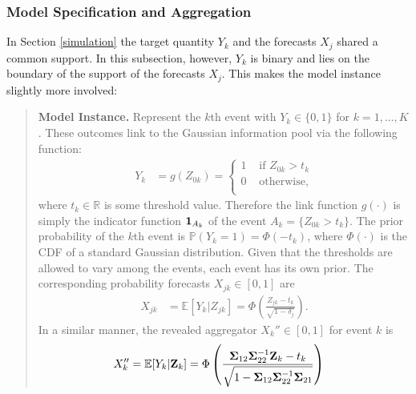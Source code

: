 \documentclass[11pt]{article}
\newcommand{\R}{\mathbb{R}}
\renewcommand{\P}{\mathbb{P}}
\newcommand{\E}{\mathbb{E}}
\theoremstyle{definition}
\theoremstyle{definition}
\def\one{{\bf 1}}
\def\bSigma{{\bf \Sigma}}
\def\Z{{\bf Z}}
\def\P{{\mathbb P}}
\def\E{{\mathbb E}}
\begin{document}
\subsubsection{Model Specification and Aggregation}
In Section \ref{simulation} the target quantity $Y_k$ and the forecasts $X_j$ shared a common support. In this subsection, however, $Y_k$ is binary and lies on the boundary of the support of the forecasts $X_j$. This makes the model instance slightly more involved:

\begin{quote}
\textbf{Model Instance.} Represent the $k$th event with $Y_k \in \{0,1\}$ for $k = 1, \dots, K$. These outcomes link to the Gaussian information pool via the following function:
\begin{align*}
Y_k &= g(Z_{0k}) = \begin{cases}
1 & \text{ if } Z_{0k} > t_k\\
0 & \text{ otherwise},\\
\end{cases}
\end{align*}
where $t_k \in \R$ is some threshold value. Therefore the link function $g(\cdot)$ is simply the indicator function $\one_{A_k}$ of the event $A_k = \{Z_{0k} > t_k\}$. The prior probability of the $k$th event is $\P(Y_k = 1) = \Phi(-t_k)$, where $\Phi(\cdot)$ is the CDF of a standard Gaussian distribution. Given that the thresholds are allowed to vary among the events, each event has its own prior. 
The corresponding probability forecasts $X_{jk} \in [0,1]$ are
\begin{align*}
X_{jk} &= \E[Y_k | Z_{jk}] = \Phi\left( \frac{Z_{jk} - t_k}{\sqrt{1-\delta_j}}\right).
\end{align*}
In a similar manner, 
 the revealed aggregator $X_k'' \in [0,1]$ for event $k$ is
\begin{align}
X_{k}'' &= \E[Y_k | \Z_k] = \Phi\left( \frac{\bSigma_{12}\bSigma_{22}^{-1}\Z_k - t_k}{\sqrt{1-\bSigma_{12}\bSigma_{22}^{-1}\bSigma_{21}}}\right) \label{RevAgg}
\end{align}
\end{quote}
\end{document}
